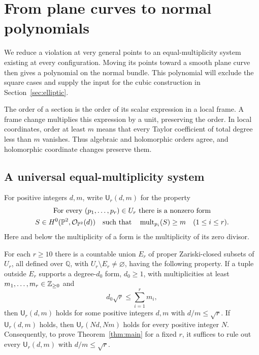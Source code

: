 \section{From plane curves to normal polynomials}
\label{sec:reductions}

We reduce a violation at very general points to an equal-multiplicity
system existing at every configuration.  Moving its points toward a
smooth plane curve then gives a polynomial on the normal bundle.
This polynomial will exclude the square cases and supply the input
for the cubic construction in Section~\ref{sec:elliptic}.

The order of a section is the order of its scalar expression in a local
frame.  A frame change multiplies this expression by a unit, preserving
the order.  In local coordinates, order at least $m$ means that every
Taylor coefficient of total degree less than $m$ vanishes.  Thus
algebraic and holomorphic orders agree, and holomorphic coordinate
changes preserve them.

\subsection{A universal equal-multiplicity system}

For positive integers $d,m$, write $\mathsf U_r(d,m)$ for the property
\begin{equation}
\label{eq:universal}
\begin{gathered}
\text{For every }(p_1,\ldots,p_r)\in U_r\text{ there is a nonzero form}\\
S\in H^0(\mathbb P^2,\mathcal O_{\mathbb P^2}(d))
\quad\text{such that}\quad
\operatorname{mult}_{p_i}(S)\ge m\quad(1\le i\le r).
\end{gathered}
\end{equation}
Here and below the multiplicity of a form is the multiplicity of its
zero divisor.

\begin{lemma}
\label{lem:universal}
For each $r\ge10$ there is a countable union $E_r$ of proper
Zariski-closed subsets of $U_r$, all defined over $\mathbb Q$, with
$U_r\setminus E_r\ne\varnothing$, having the following property.
If a tuple outside $E_r$ supports a
degree-$d_0$ form, $d_0\ge1$, with multiplicities at least
$m_1,\ldots,m_r\in\mathbb Z_{\ge0}$ and
\[
 d_0\sqrt r\le\sum_{i=1}^r m_i,
\]
then $\mathsf U_r(d,m)$ holds for some positive integers $d,m$ with
$d/m\le\sqrt r$.  If $\mathsf U_r(d,m)$ holds, then
$\mathsf U_r(Nd,Nm)$ holds for every positive integer $N$.
Consequently, to prove Theorem~\ref{thm:main} for a fixed $r$, it suffices
to rule out every $\mathsf U_r(d,m)$ with $d/m\le\sqrt r$.
\end{lemma}

